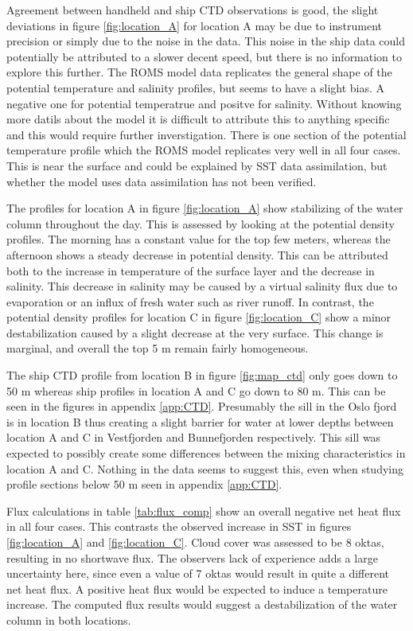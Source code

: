 \documentclass[a4paper,10pt,english]{article}
\begin{document}
Agreement between handheld and ship CTD observations is good, the slight deviations in figure \ref*{fig:location_A} for location A may be due to instrument precision or simply due to the noise in the data. This noise in the ship data could potentially be attributed to a slower decent speed, but there is no information to explore this further. The ROMS model data replicates the general shape of the potential temperature and salinity profiles, but seems to have a slight bias. A negative one for potential temperatrue and positve for salinity. Without knowing more datils about the model it is difficult to attribute this to anything specific and this would require further inverstigation. There is one section of the potential temperature profile which the ROMS model replicates very well in all four cases. This is near the surface and could be explained by SST data assimilation, but whether the model uses data assimilation has not been verified.

The profiles for location A in figure \ref*{fig:location_A} show stabilizing of the water column throughout the day. This is assessed by looking at the potential density profiles. The morning has a constant value for the top few meters, whereas the afternoon shows a steady decrease in potential density. This can be attributed both to the increase in temperature of the surface layer and the decrease in salinity. This decrease in salinity may be caused by a virtual salinity flux due to evaporation or an influx of fresh water such as river runoff. In contrast, the potential density profiles for location C in figure \ref*{fig:location_C} show a minor destabilization caused by a slight decrease at the very surface. This change is marginal, and overall the top 5 m remain fairly homogeneous.

The ship CTD profile from location B in figure \ref*{fig:map_ctd} only goes down to 50 m whereas ship profiles in location A and C go down to 80 m. This can be seen in the figures in appendix \ref*{app:CTD}. Presumably the sill in the Oslo fjord is in location B thus creating a slight barrier for water at lower depths between location A and C in Vestfjorden and Bunnefjorden respectively. This sill was expected to possibly create some differences between the mixing characteristics in location A and C. Nothing in the data seems to suggest this, even when studying profile sections below 50 m seen in appendix \ref*{app:CTD}.

Flux calculations in table \ref*{tab:flux_comp} show an overall negative net heat flux in all four cases. This contrasts the observed increase in SST in figures  \ref*{fig:location_A} and \ref*{fig:location_C}. Cloud cover was assessed to be 8 oktas, resulting in no shortwave flux. The observers lack of experience adds a large uncertainty here, since even a value of 7 oktas would result in quite a different net heat flux. A positive heat flux would be expected to induce a temperature increase. The computed flux results would suggest a destabilization of the water column in both locations.
\end{document}
